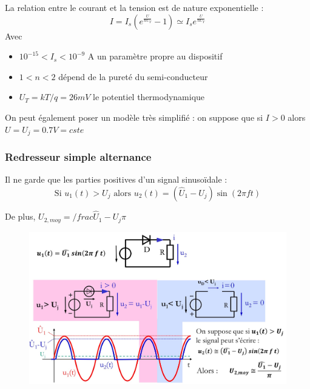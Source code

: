 \documentclass[../main.tex]{subfiles}
\begin{document}
La relation entre le courant et la tension est de nature exponentielle : \begin{equation}
    I = I_s (e^{\frac{U}{nU_T}}-1) \simeq I_s e^{\frac{U}{nU_T}}
\end{equation}
Avec \begin{itemize}
    \item $10^{-15}<I_s<10^{-9}$ A un paramètre propre au dispositif\\
    \item $1<n<2$ dépend de la pureté du semi-conducteur\\
    \item $U_T = kT/q = 26mV$ le potentiel thermodynamique\\
\end{itemize}

On peut également poser un modèle très simplifié : on suppose que si $I>0$ alors $U=U_j = 0.7V = cste$\\

\subsubsection{Redresseur simple alternance}
Il ne garde que les parties positives d'un signal sinusoïdale : \\
\begin{equation}
    \text{Si } u_1(t) > U_j \text{ alors } u_2(t) = (\hat{U}_1-U_j) \sin(2\pi f t)
\end{equation}

De plus, $U_{2,moy} = /frac{\hat{U}_1-U_j}{\pi}$\\

\begin{figure}[hbt!]
    \centering
    \includegraphics[width=\textwidth]{IMAGES/elec/Diode1.jpeg}
\end{figure}
\end{document}
